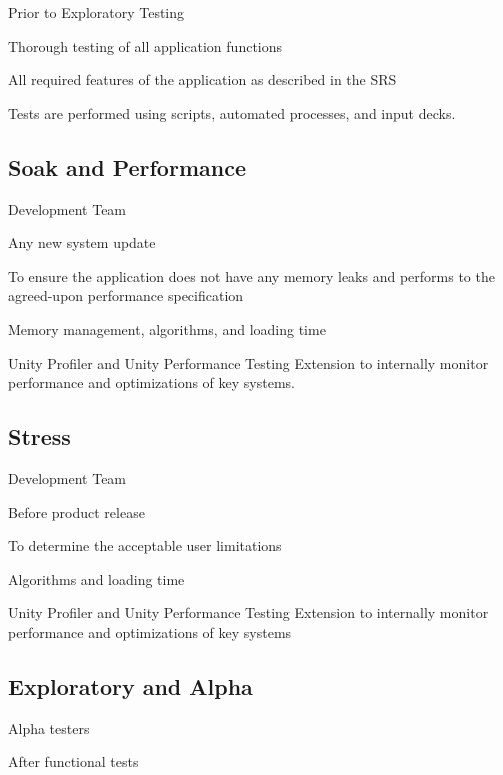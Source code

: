 \documentclass[letterpaper,10pt,english,openany,oneside]{sphinxmanual}
\begin{document}
 Prior to Exploratory Testing

 Thorough testing of all application functions

 All required features of the application as described in the SRS

 Tests are performed using scripts, automated processes, and input decks.


\subsection{Soak and Performance}
\label{\detokenize{test_plan/strategy:soak-and-performance}}
 Development Team

 Any new system update

 To ensure the application does not have any memory leaks and performs to the agreed-upon performance specification

 Memory management, algorithms, and loading time

 Unity Profiler and Unity Performance Testing Extension to internally monitor performance and optimizations of key systems.


\subsection{Stress}
\label{\detokenize{test_plan/strategy:stress}}
 Development Team

 Before product release

 To determine the acceptable user limitations

 Algorithms and loading time

 Unity Profiler and Unity Performance Testing Extension to internally monitor performance and optimizations of key systems


\subsection{Exploratory and Alpha}
\label{\detokenize{test_plan/strategy:exploratory-and-alpha}}
 Alpha testers

 After functional tests
\end{document}
